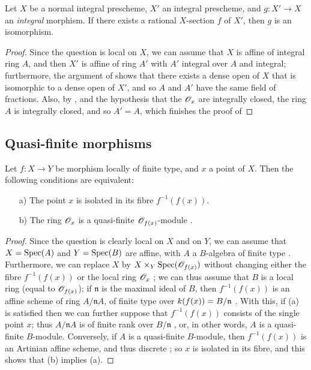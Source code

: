 \begin{corollary}[6.1.15]
\label{II.6.1.15}
Let $X$ be a normal integral prescheme, $X'$ an integral prescheme, and $g:X'\to X$ an \emph{integral} morphism.
If there exists a rational $X$-section $f$ of $X'$, then $g$ is an isomorphism.
\end{corollary}

\begin{proof}
Since the question is local on $X$, we can assume that $X$ is affine of integral ring $A$, and then $X'$ is affine of ring $A'$ with $A'$ integral over $A$  and integral;
furthermore, the argument of  shows that there exists a dense open of $X$ that is isomorphic to a dense open of $X'$, and so $A$ and $A'$ have the same field of fractions.
Also, by , and the hypothesis that the $\mathscr{O}_x$ are integrally closed, the ring $A$ is integrally closed, and so $A'=A$, which finishes the proof of 
\end{proof}


\subsection{Quasi-finite morphisms}
\label{subsection:II.6.2}

\begin{proposition}[6.2.1]
\label{II.6.2.1}
Let $f:X\to Y$ be morphism locally of finite type, and $x$ a point of $X$.
Then the following conditions are equivalent:
\begin{enumerate}
  \item[a)] The point $x$ is isolated in its fibre $f^{-1}(f(x))$.
  \item[b)] The ring $\mathscr{O}_x$ is a quasi-finite $\mathscr{O}_{f(x)}$-module .
\end{enumerate}
\end{proposition}

\begin{proof}
Since the question is clearly local on $X$ and on $Y$, we can assume that $X=\operatorname{Spec}(A)$ and $Y=\operatorname{Spec}(B)$ are affine, with $A$ a $B$-algebra of finite type .
Furthermore, we can replace $X$ by $X\times_Y\operatorname{Spec}(\mathscr{O}_{f(x)})$ without changing either the fibre $f^{-1}(f(x))$ or the local ring $\mathscr{O}_x$ ;
we can thus assume that $B$ is a local ring (equal to $\mathscr{O}_{f(x)}$);
if $\mathfrak{n}$ is the maximal ideal of $B$, then $f^{-1}(f(x))$ is an affine scheme of ring $A/\mathfrak{n}A$, of finite type over $k(f(x))=B/\mathfrak{n}$ .
With this, if (a) is satisfied then we can further suppose that $f^{-1}(f(x))$ consists of the single point $x$;
thus $A/\mathfrak{n}A$ is of finite rank over $B/\mathfrak{n}$ , or, in other words, $A$ is a quasi-finite $B$-module.
Conversely, if $A$ is a quasi-finite $B$-module, then $f^{-1}(f(x))$ is an Artinian affine scheme, and thus discrete ;
so $x$ is isolated in its fibre, and this shows that (b) implies (a).
\end{proof}

